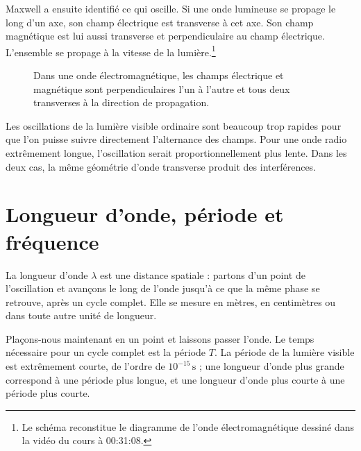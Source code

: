 Maxwell a ensuite identifié ce qui oscille. Si une onde lumineuse se propage le long d’un axe, son champ électrique est transverse à cet axe. Son champ magnétique est lui aussi transverse et perpendiculaire au champ électrique. L’ensemble se propage à la vitesse de la lumière.\footnote{Le schéma reconstitue le diagramme de l’onde électromagnétique dessiné dans la vidéo du cours à 00:31:08.}

\begin{figure}[h]\centering
{}\caption{Dans une onde électromagnétique, les champs électrique et magnétique sont perpendiculaires l’un à l’autre et tous deux transverses à la direction de propagation.}\end{figure}

Les oscillations de la lumière visible ordinaire sont beaucoup trop rapides pour que l’on puisse suivre directement l’alternance des champs. Pour une onde radio extrêmement longue, l’oscillation serait proportionnellement plus lente. Dans les deux cas, la même géométrie d’onde transverse produit des interférences.

\section{Longueur d’onde, période et fréquence}

La longueur d’onde \(\lambda\) est une distance spatiale : partons d’un point de l’oscillation et avançons le long de l’onde jusqu’à ce que la même phase se retrouve, après un cycle complet. Elle se mesure en mètres, en centimètres ou dans toute autre unité de longueur.

Plaçons-nous maintenant en un point et laissons passer l’onde. Le temps nécessaire pour un cycle complet est la période \(T\). La période de la lumière visible est extrêmement courte, de l’ordre de \(10^{-15}\,\mathrm{s}\) ; une longueur d’onde plus grande correspond à une période plus longue, et une longueur d’onde plus courte à une période plus courte.

